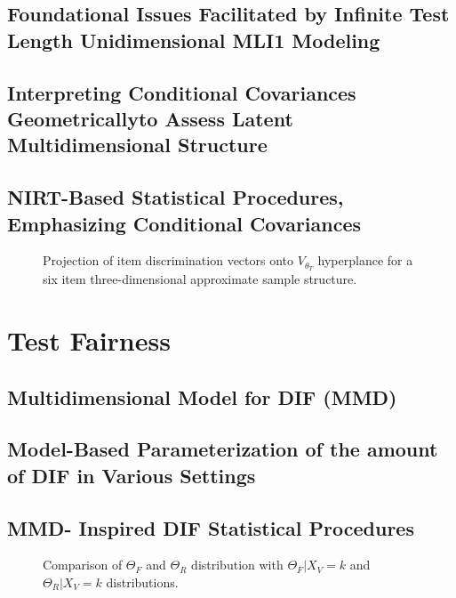 \documentclass[titlepage,11pt,twoside]{article}
\begin{document}
\subsection{Foundational Issues Facilitated by Infinite Test Length Unidimensional MLI1 Modeling}

\subsection{Interpreting Conditional Covariances Geometrically\break to Assess Latent Multidimensional Structure}


\subsection{NIRT-Based Statistical Procedures, Emphasizing Conditional Covariances}


\begin{figure}[h]
\caption{Projection of item discrimination vectors onto $V_{\theta_T}$ hyperplance for a six item three-dimensional approximate sample structure.}
\end{figure}



\section{Test Fairness}



\subsection{Multidimensional Model for DIF (MMD)}



\subsection{Model-Based Parameterization of the amount of DIF in Various Settings}



\subsection{MMD- Inspired DIF Statistical Procedures}



\begin{figure}[h]
\caption{Comparison of $\Theta_F$ and $\Theta_R $ distribution with $\Theta_F \vert X_V = k$ and $\Theta_R \vert X_V = k$ distributions.}
\end{figure}
\end{document}
